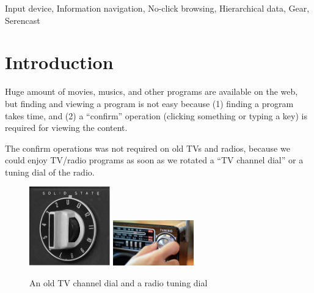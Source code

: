 \documentclass[conference]{IEEEtran}
\begin{document}
\begin{IEEEkeywords}
  Input device, Information navigation, No-click browsing,
  Hierarchical data, Gear, Serencast
\end{IEEEkeywords}

\section{Introduction}

% 

Huge amount of movies, musics, and other programs are available on the web, but
finding and viewing a program is not easy because
(1) finding a program takes time, and
(2) a ``confirm'' operation (clicking something or typing a key)
is required for viewing the content.


The confirm operations was not required on old TVs and radios,
because we could enjoy TV/radio programs
as soon as we rotated a ``TV channel dial'' or a tuning dial of the radio.

\begin{figure}[H]
\centerline{
   \includegraphics[width=35mm,bb=0 0 279 272]{figures/9bd96506bdaac48b26c5cd192851c11d.png}
   \includegraphics[width=35mm,bb=0 0 128 72]{figures/fedc4f3c899c48b5a3ddd0982801c79d.png}
}
\caption{An old TV channel dial and a radio tuning dial}
\label{TV channel}
\end{figure}


\end{document}
